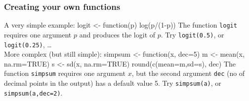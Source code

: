 \documentclass{beamer}
\newcommand{\code}[1]{\texttt{#1}}
\let\overbatim\verbatim
\let\endoverbatim\endverbatim
\newenvironment{vcode}%
{\bgroup\baselineskip=0.8\baselineskip\overbatim}%
{\endoverbatim\egroup}
\newcounter{demo}
\newcommand{\Demo}{\stepcounter{demo}\frametitle{Demo \arabic{demo}}}
\begin{document}
\begin{frame}[fragile]
\frametitle{Creating your own functions}
A very simple example: 
\begin{vcode}
logit <- function(p)  log(p/(1-p))
\end{vcode}
The function \code{logit} requires one argument $p$ and produces the logit of $p$. Try  
\code{logit(0.5)}, or \code{logit(0.25)}, \ldots \\[0.3cm]
More complex (but still simple):
\begin{vcode}
simpsum <- function(x, dec=5) {
m <- mean(x, na.rm=TRUE)
s  <- sd(x, na.rm=TRUE)
 round(c(mean=m,sd=s), dec) } 
\end{vcode}
The function \code{simpsum} requires one argument $x$, but the second argument \code{dec} (no of decimal points in the output) has a default value 5. Try \code{simpsum(a)}, or \code{simpsum(a,dec=2)}.
\end{frame}
\end{document}
